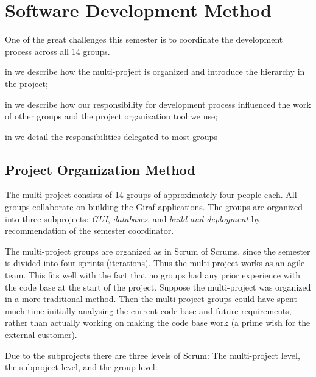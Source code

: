 \chapter{Software Development Method}\label{chap:sw_dev_method}
One of the great challenges this semester is to coordinate the development process across all 14 groups. 

\begin{chapterorganization}
  \item in  we describe how the multi-project is organized and introduce the hierarchy in the project;
  \item in  we describe how our responsibility for development process influenced the work of other groups and the project organization tool we use;
  \item {}
  \item in  we detail the responsibilities delegated to most groups
\end{chapterorganization}

\section{Project Organization Method}\label{sec:project_overview}
The multi-project consists of 14 groups of approximately four people each. All groups collaborate on building the Giraf applications. The groups are organized into three subprojects: \emph{GUI}, \emph{databases}, and \emph{build and deployment} by recommendation of the semester coordinator.

The multi-project groups are organized as in Scrum of Scrums, since the semester is divided into four sprints (iterations). Thus the multi-project works as an agile team. This fits well with the fact that no groups had any prior experience with the code base at the start of the project. Suppose the multi-project was organized in a more traditional method. Then the multi-project groups could have spent much time initially analysing the current code base and future requirements, rather than actually working on making the code base work (a prime wish for the external customer).

Due to the subprojects there are three levels of Scrum: The multi-project level, the subproject level, and the group level:

